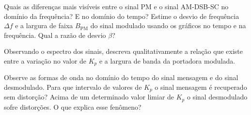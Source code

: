 \documentclass[12pt,addpoints]{exam}
\begin{document}
\begin{questions}
    \question Quais as diferenças mais visíveis entre o sinal PM e o sinal AM-DSB-SC no domínio da frequência? E no domínio do tempo?
    \fillwithlines{1.5in}
    \question Estime o desvio de frequência $\Delta f$ e a largura de faixa $B_{\text{PM}}$ do sinal modulado usando os gráficos no tempo e na frequência. Qual a razão de desvio $\beta$?
    \fillwithlines{0.75in}
    
    \question Observando o espectro dos sinais, descreva qualitativamente a relação que existe entre a variação no valor de $K_{p}$ e a largura de banda da portadora modulada.
    \fillwithlines{1.0in}
     
    \question Observe as formas de onda no domínio do tempo do sinal mensagem e do sinal desmodulado. Para que intervalo de valores de $K_p$ o sinal mensagem é recuperado sem distorção? Acima de um determinado valor limiar de $K_p$ o sinal desmodulado sofre distorções. O que explica esse fenômeno?
    \fillwithlines{1.50in}


    
    
%    
\end{questions}
\end{document}
